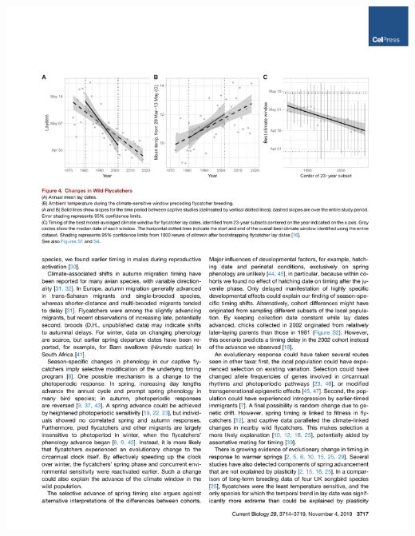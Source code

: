 \documentclass[a4paper, twoside]{templates/ociamthesis}
\begin{document}
\begin{center}\includegraphics[width=1\linewidth]{pdf_chapters/pied/pied_crop_Part04} \end{center}
\end{document}
